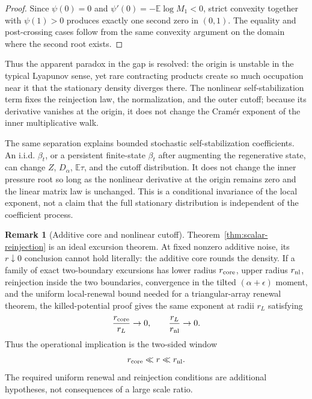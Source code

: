 \documentclass[11pt]{article}
\theoremstyle{definition}
\newtheorem{remark}{Remark}
\newcommand{\E}{\mathbb E}
\begin{document}
\begin{proof}
Since $\psi(0)=0$ and
$\psi'(0)=-\E\log M_1<0$, strict convexity together with
$\psi(1)>0$ produces exactly one second zero in $(0,1)$.  The equality and
post-crossing cases follow from the same convexity argument on the domain
where the second root exists.
\end{proof}

Thus the apparent paradox in the gap is resolved: the origin is unstable in
the typical Lyapunov sense, yet rare contracting products create so much
occupation near it that the stationary density diverges there.  The nonlinear
self-stabilization term fixes the reinjection law, the normalization, and the
outer cutoff; because its derivative vanishes at the origin, it does not
change the Cram\'er exponent of the inner multiplicative walk.

The same separation explains bounded stochastic self-stabilization
coefficients.  An i.i.d. $\beta_t$, or a persistent finite-state $\beta_t$
after augmenting the regenerative state, can change $Z$, $D_\alpha$,
$\E\tau$, and the cutoff distribution.  It does not change the inner
pressure root so long as the nonlinear derivative at the origin remains zero
and the linear matrix law is unchanged.  This is a conditional invariance of
the local exponent, not a claim that the full stationary distribution is
independent of the coefficient process.

\begin{remark}[Additive core and nonlinear cutoff]
\label{rem:reinjection-window}
Theorem~\ref{thm:scalar-reinjection} is an ideal excursion theorem.  At fixed
nonzero additive noise, its $r\downarrow0$ conclusion cannot hold literally:
the additive core rounds the density.  If a family of exact two-boundary
excursions has lower radius $r_{\rm core}$, upper radius $r_{\rm nl}$,
reinjection inside the two boundaries, convergence in the tilted
$(\alpha+\epsilon)$ moment, and the uniform local-renewal bound needed for a
triangular-array renewal theorem, the killed-potential proof gives the same
exponent at radii $r_L$ satisfying
\begin{equation}
 \frac{r_{\rm core}}{r_L}\to0,
 \qquad
 \frac{r_L}{r_{\rm nl}}\to0.
 \label{eq:explicit-intermediate-window}
\end{equation}
Thus the operational implication is the two-sided window
\begin{equation}
 r_{\rm core}\ll r\ll r_{\rm nl}.
 \label{eq:reinjection-window-short}
\end{equation}
The required uniform renewal and reinjection conditions are additional
hypotheses, not consequences of a large scale ratio.
\end{remark}
\end{document}

